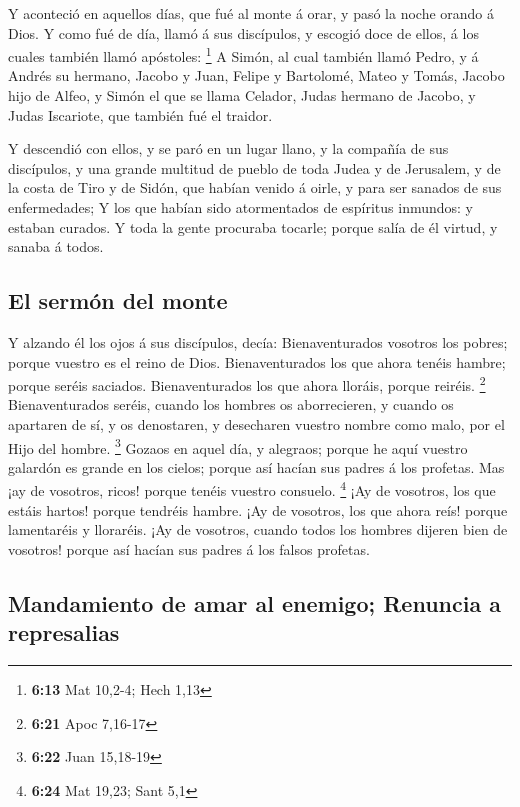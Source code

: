  Y aconteció en aquellos días, que fué al monte á orar, y
pasó la noche orando á Dios.  Y como fué de día, llamó á
sus discípulos, y escogió doce de ellos, á los cuales también llamó
apóstoles: \footnote{\textbf{6:13} Mat 10,2-4; Hech 1,13} 
A Simón, al cual también llamó Pedro, y á Andrés su hermano, Jacobo y
Juan, Felipe y Bartolomé,  Mateo y Tomás, Jacobo hijo de
Alfeo, y Simón el que se llama Celador,  Judas hermano de
Jacobo, y Judas Iscariote, que también fué el traidor.

 Y descendió con ellos, y se paró en un lugar llano, y la
compañía de sus discípulos, y una grande multitud de pueblo de toda
Judea y de Jerusalem, y de la costa de Tiro y de Sidón, que habían
venido á oirle, y para ser sanados de sus enfermedades;  Y
los que habían sido atormentados de espíritus inmundos: y estaban
curados.  Y toda la gente procuraba tocarle; porque salía
de él virtud, y sanaba á todos.

\hypertarget{el-sermuxf3n-del-monte}{%
\subsection{El sermón del monte}\label{el-sermuxf3n-del-monte}}

 Y alzando él los ojos á sus discípulos, decía:
Bienaventurados vosotros los pobres; porque vuestro es el reino de Dios.
 Bienaventurados los que ahora tenéis hambre; porque seréis
saciados. Bienaventurados los que ahora lloráis, porque reiréis.
\footnote{\textbf{6:21} Apoc 7,16-17}  Bienaventurados
seréis, cuando los hombres os aborrecieren, y cuando os apartaren de sí,
y os denostaren, y desecharen vuestro nombre como malo, por el Hijo del
hombre. \footnote{\textbf{6:22} Juan 15,18-19}  Gozaos en
aquel día, y alegraos; porque he aquí vuestro galardón es grande en los
cielos; porque así hacían sus padres á los profetas.  Mas
¡ay de vosotros, ricos! porque tenéis vuestro consuelo. \footnote{\textbf{6:24}
  Mat 19,23; Sant 5,1}  ¡Ay de vosotros, los que estáis
hartos! porque tendréis hambre. ¡Ay de vosotros, los que ahora reís!
porque lamentaréis y lloraréis.  ¡Ay de vosotros, cuando
todos los hombres dijeren bien de vosotros! porque así hacían sus padres
á los falsos profetas.

\hypertarget{mandamiento-de-amar-al-enemigo-renuncia-a-represalias}{%
\subsection{Mandamiento de amar al enemigo; Renuncia a
represalias}\label{mandamiento-de-amar-al-enemigo-renuncia-a-represalias}}

